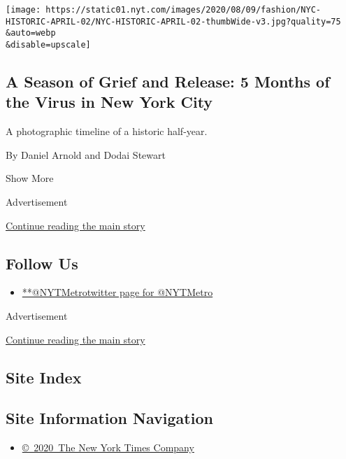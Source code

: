 \begin{enumerate}
  \texttt{[image: https://static01.nyt.com/images/2020/08/09/fashion/NYC-HISTORIC-APRIL-02/NYC-HISTORIC-APRIL-02-thumbWide-v3.jpg?quality=75\\\&auto=webp\\\&disable=upscale]}

  \hypertarget{a-season-of-grief-and-release-5-months-of-the-virus-in-new-york-city}{%
  \subsection{A Season of Grief and Release: 5 Months of the Virus in
  New York
  City}\label{a-season-of-grief-and-release-5-months-of-the-virus-in-new-york-city}}

  A photographic timeline of a historic half-year.

  By Daniel Arnold and Dodai Stewart
\end{enumerate}

Show More

Advertisement

\protect\hyperlink{after-mid2}{Continue reading the main story}

\hypertarget{follow-us}{%
\subsection{Follow Us}\label{follow-us}}

\begin{itemize}
\tightlist
\item
  \href{https://twitter.com/NYTMetro}{**@NYTMetrotwitter page for
  @NYTMetro}
\end{itemize}

Advertisement

\protect\hyperlink{after-mktg}{Continue reading the main story}

\hypertarget{site-index}{%
\subsection{Site Index}\label{site-index}}

\hypertarget{site-information-navigation}{%
\subsection{Site Information
Navigation}\label{site-information-navigation}}

\begin{itemize}
\tightlist
\item
  \href{https://help.nytimes.com/hc/en-us/articles/115014792127-Copyright-notice}{©~2020~The
  New York Times Company}
\end{itemize}

